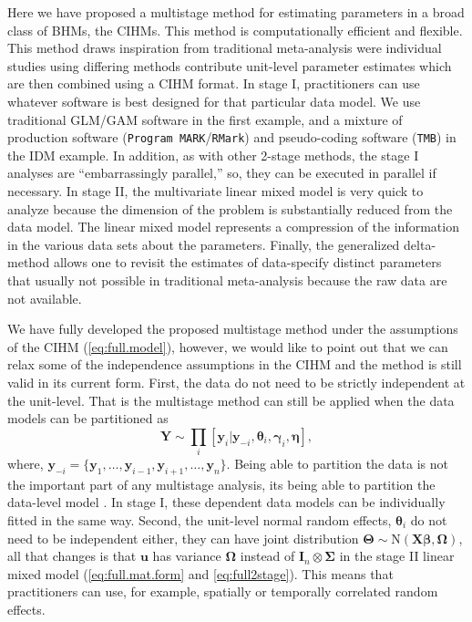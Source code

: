 \documentclass[12pt]{article}
\newcommand{\by}{\mathbf{y}}
\newcommand{\bt}{\boldsymbol{\theta}}
\newcommand{\bb}{\boldsymbol{\beta}}
\newcommand{\bn}{\boldsymbol{\eta}}
\newcommand{\bT}{\boldsymbol{\Theta}}
\newcommand{\bg}{\boldsymbol{\gamma}}
\newcommand{\bSig}{\boldsymbol{\Sigma}}
\newcommand{\bO}{\boldsymbol{\Omega}}
\newcommand{\bX}{\mathbf{X}}
\newcommand{\bu}{\mathbf{u}}
\newcommand{\tN}{\text{N}}
\newcommand{\bY}{\mathbf{Y}}
\newcommand{\bI}{\mathbf{I}}
\begin{document}
Here we have proposed a multistage method for estimating parameters in a broad class of BHMs, the CIHMs. This method is computationally efficient and flexible. This method draws inspiration from traditional meta-analysis were individual studies using differing methods contribute unit-level parameter estimates which are then combined using a CIHM format. In stage I, practitioners can use whatever software is best designed for that particular data model. We use traditional GLM/GAM software in the first example, and a mixture of production software ({\tt Program MARK}/{\tt RMark}) and pseudo-coding software ({\tt TMB}) in the IDM example. In addition, as with other 2-stage methods, the stage I analyses are ``embarrassingly parallel,'' so, they can be executed in parallel if necessary. In stage II, the multivariate linear mixed model is very quick to analyze because the dimension of the problem is substantially reduced from the data model. The linear mixed model represents a compression of the information in the various data sets about the parameters. Finally, the generalized delta-method allows one to revisit the estimates of data-specify distinct parameters that usually not possible in traditional meta-analysis because the raw data are not available.  

We have fully developed the proposed multistage method under the assumptions of the CIHM (\ref{eq:full.model}), however, we would like to point out that we can relax some of the independence assumptions in the CIHM and the method is still valid in its current form. First, the data do not need to be strictly independent at the unit-level. That is the multistage method can still be applied when the data models can be partitioned as
\[
\bY \sim \prod_i[\by_i|\by_{-i}, \bt_i, \bg_i, \bn],
\]
where, $\by_{-i} = \{\by_1,\dots,\by_{i-1},\by_{i+1},\dots,\by_n\}$. Being able to partition the data is not the important part of any multistage analysis, its being able to partition the data-level model \citep{hooten2018prior}. In stage I, these dependent data models can be individually fitted in the same way. Second, the unit-level normal random effects, $\bt_i$ do not need to be independent either, they can have joint distribution $\bT  \sim \tN(\bX\bb, \bO)$, all that changes is that $\bu$ has variance $\bO$ instead of $\bI_n \otimes \bSig$ in the stage II linear mixed model (\ref{eq:full.mat.form} and \ref{eq:full2stage}). This means that practitioners can use, for example, spatially or temporally correlated random effects. 
\end{document}
